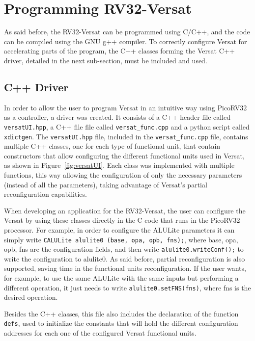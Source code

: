 
\section{Programming RV32-Versat}
\label{section:programming}

As said before, the RV32-Versat can be programmed using C/C++, and the code can
be compiled using the GNU g++ compiler. To correctly configure Versat for
accelerating parts of the program, the C++ classes forming the Versat C++
driver, detailed in the next sub-section, must be included and used.

\subsection{C++ Driver}
\label{subsection:c-driver}

In order to allow the user to program Versat in an intuitive way using PicoRV32
as a controller, a driver was created. It consists of a C++ header file called
{\tt versatUI.hpp}, a C++ file file called {\tt versat\_func.cpp} and a python script 
called
{\tt xdictgen}. The {\tt versatUI.hpp} file, included in the {\tt versat\_func.cpp} file, 
contains multiple C++ classes, one for each type of functional unit, that contain
constructors that allow configuring the different functional units used in
Versat, as shown in Figure~\ref{fig:versatUI}. Each class was implemented with
multiple functions, this way allowing the configuration of only the necessary
parameters (instead of all the parameters), taking advantage of Versat's partial
reconfiguration capabilities.

When developing an application for the RV32-Versat, the user can configure the
Versat by using these classes directly in the C code that runs in the PicoRV32
processor. For example, in order to configure the ALULite parameters it can
simply write {\tt CALULite alulite0 (base, opa, opb, fns);}, where base,
opa, opb, fns are the configuration fields, and then write
{\tt alulite0.writeConf();} to write the configuration to alulite0. As
said before, partial reconfiguration is also supported, saving time in the
functional units reconfiguration. If the user wants, for example, to use the
same ALULite with the same inputs but performing a different operation, it just
needs to write {\tt alulite0.setFNS(fns)}, where fns is the desired
operation.

Besides the C++ classes, this file also includes the declaration of the function
{\tt defs}, used to initialize the constants that will hold the different
configuration addresses for each one of the configured Versat functional units.

